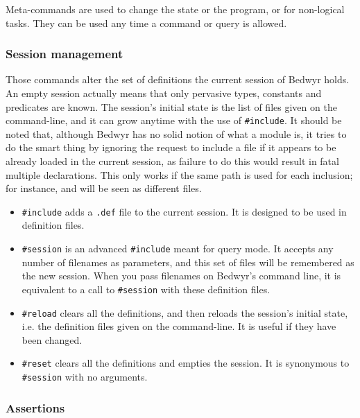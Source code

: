 Meta-commands are used to change the state or the program, or for
non-logical tasks.  They can be used any time a command or query is
allowed.

\subsubsection{Session management}

Those commands alter the set of definitions the current session of
Bedwyr holds.  An empty session actually means that only pervasive
types, constants and predicates are known.  The session's initial state
is the list of files given on the command-line, and it can grow anytime
with the use of \lstinline{#include}.  It should be noted that, although
Bedwyr has no solid notion of what a module is, it tries to do the smart
thing by ignoring the request to include a file if it appears to be
already loaded in the current session, as failure to do this would
result in fatal multiple declarations.  This only works if the same path
is used for each inclusion; for instance,  and
 will be seen as different files.
\begin{itemize}
  \item \lstinline{#include} adds a \verb|.def| file to the current
    session.  It is designed to be used in definition files.

  \item \lstinline{#session} is an advanced \lstinline{#include} meant
    for query mode.  It accepts any number of filenames as parameters,
    and this set of files will be remembered as the new session.  When
    you pass filenames on Bedwyr's command line, it is equivalent to a
    call to \lstinline{#session} with these definition files.

  \item \lstinline{#reload} clears all the definitions, and then reloads
    the session's initial state, i.e. the definition files given on the
    command-line.  It is useful if they have been changed.

  \item \lstinline{#reset} clears all the definitions and empties the
    session.  It is synonymous to \lstinline{#session} with no
    arguments.
\end{itemize}

\subsubsection{Assertions}

